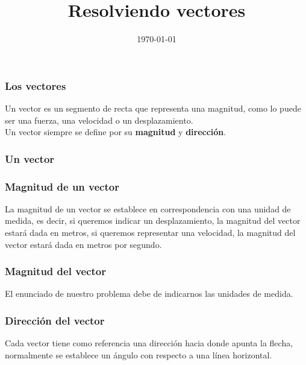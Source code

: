 \documentclass[14pt, xcolor={usenames,dvipsnames}]{beamer}
\title{Resolviendo vectores}
\author{}
\date{\today}
\begin{document}
\frame{\titlepage}
\begin{frame}
\frametitle{Los vectores}
Un vector es un segmento de recta que representa una magnitud, como lo puede ser una fuerza, una velocidad o un desplazamiento.
\\
\bigskip
\pause
Un vector siempre se define por su \textbf{magnitud} y \textbf{dirección}.
\end{frame}
\begin{frame}
\frametitle{Un vector}
\begin{figure}
\centering
{}
\end{figure}
\end{frame}
\begin{frame}
\frametitle{Magnitud de un vector}
La magnitud de un vector se establece en correspondencia con una unidad de medida, es decir, si queremos indicar un desplazamiento, la magnitud del vector estará dada en metros, si queremos representar una velocidad, la magnitud del vector estará dada en metros por segundo.
\end{frame}
\begin{frame}
\frametitle{Magnitud del vector}
\begin{figure}
\centering
{}
\end{figure}
El enunciado de nuestro problema debe de indicarnos las unidades de medida.
\end{frame}
\begin{frame}
\frametitle{Dirección del vector}
Cada vector tiene como referencia una dirección hacia donde apunta la flecha, normalmente se establece un ángulo con respecto a una línea horizontal.
\end{frame}
\end{document}
